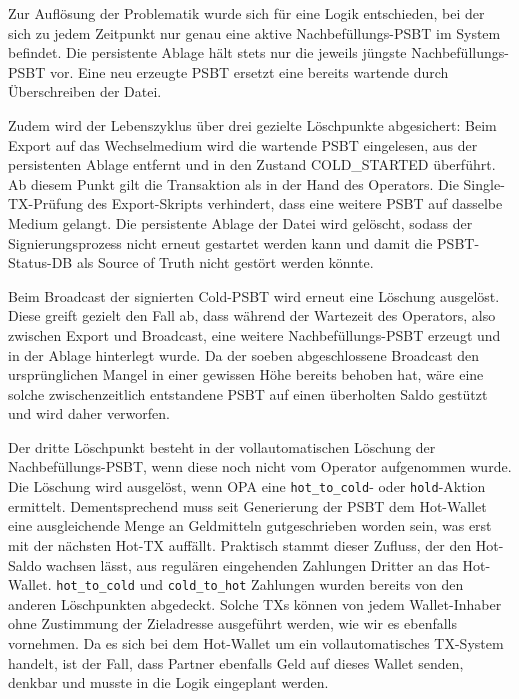Zur Auflösung der Problematik wurde sich für eine Logik entschieden, bei der sich zu jedem Zeitpunkt nur genau eine aktive Nachbefüllungs-\ac{PSBT} im System befindet. Die persistente Ablage hält stets nur die jeweils jüngste Nachbefüllungs-\ac{PSBT} vor. Eine neu erzeugte \ac{PSBT} ersetzt eine bereits wartende durch Überschreiben der Datei.

Zudem wird der Lebenszyklus über drei gezielte Löschpunkte abgesichert:
Beim Export auf das Wechselmedium wird die wartende \ac{PSBT} eingelesen, aus der persistenten Ablage entfernt und in den Zustand \linebreak COLD\_STARTED überführt. Ab diesem Punkt gilt die Transaktion als in der Hand des Operators. Die Single-\ac{TX}-Prüfung des Export-Skripts verhindert, dass eine weitere \ac{PSBT} auf dasselbe Medium gelangt. Die persistente Ablage der Datei wird gelöscht, sodass der Signierungsprozess nicht erneut gestartet werden kann und damit die \ac{PSBT}-Status-\ac{DB} als Source of Truth nicht gestört werden könnte.

Beim Broadcast der signierten Cold-\ac{PSBT} wird erneut eine Löschung ausgelöst. Diese greift gezielt den Fall ab, dass während der Wartezeit des Operators, also zwischen Export und Broadcast, eine weitere Nachbefüllungs-\ac{PSBT} erzeugt und in der Ablage hinterlegt wurde. Da der soeben abgeschlossene Broadcast den ursprünglichen Mangel in einer gewissen Höhe bereits behoben hat, wäre eine solche zwischenzeitlich entstandene \ac{PSBT} auf einen überholten Saldo gestützt und wird daher verworfen.

Der dritte Löschpunkt besteht in der vollautomatischen Löschung der Nachbefüllungs-\ac{PSBT}, wenn diese noch nicht vom Operator aufgenommen wurde. Die Löschung wird ausgelöst, wenn \ac{OPA} eine \texttt{hot\_to\_cold}- oder \texttt{hold}-Aktion ermittelt. Dementsprechend muss seit Generierung der \ac{PSBT} dem Hot-Wallet eine ausgleichende Menge an Geldmitteln gutgeschrieben worden sein, was erst mit der nächsten Hot-\ac{TX} auffällt.
Praktisch stammt dieser Zufluss, der den Hot-Saldo wachsen lässt, aus regulären eingehenden Zahlungen Dritter an das Hot-Wallet. \texttt{hot\_to\_cold} und \texttt{cold\_to\_hot} Zahlungen wurden bereits von den anderen Löschpunkten abgedeckt.
Solche \acp{TX} können von jedem Wallet-Inhaber ohne Zustimmung der Zieladresse ausgeführt werden, wie wir es ebenfalls vornehmen. Da es sich bei dem Hot-Wallet um ein vollautomatisches \ac{TX}-System handelt, ist der Fall, dass Partner ebenfalls Geld auf dieses Wallet senden, denkbar und musste in die Logik eingeplant werden.

